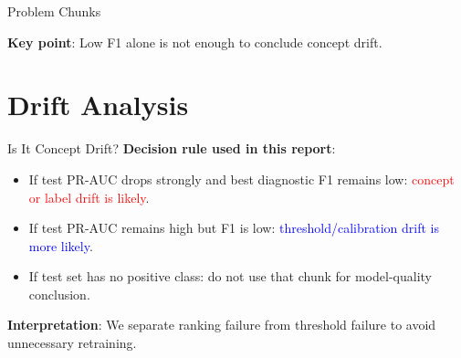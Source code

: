 \documentclass{beamer}
\begin{document}
\begin{frame}{Problem Chunks}
    \begin{table}
        \centering
        \tiny
        \caption{Diagnosis for selected low-F1 chunks using \texttt{xgb\_class\_weight}.}
    \end{table}

    \vspace{0.2cm}
    \textbf{Key point}: Low F1 alone is not enough to conclude concept drift.
\end{frame}

\section{Drift Analysis}

\begin{frame}{Is It Concept Drift?}
    \textbf{Decision rule used in this report}:
    \begin{itemize}
        \item If test PR-AUC drops strongly and best diagnostic F1 remains low:
        \textcolor{red}{concept or label drift is likely}.
        \item If test PR-AUC remains high but F1 is low:
        \textcolor{blue}{threshold/calibration drift is more likely}.
        \item If test set has no positive class:
        do not use that chunk for model-quality conclusion.
    \end{itemize}

    \vspace{0.35cm}
    \textbf{Interpretation}: We separate ranking failure from threshold failure to avoid unnecessary retraining.
\end{frame}
\end{document}

